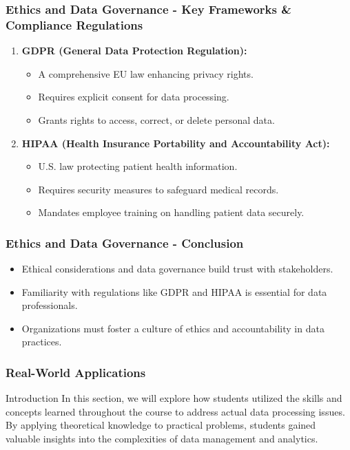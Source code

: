 \documentclass{beamer}
\begin{document}
\begin{frame}[fragile]
    \frametitle{Ethics and Data Governance - Key Frameworks \& Compliance Regulations}
    \begin{enumerate}
        \item \textbf{GDPR (General Data Protection Regulation):}
            \begin{itemize}
                \item A comprehensive EU law enhancing privacy rights.
                \item Requires explicit consent for data processing.
                \item Grants rights to access, correct, or delete personal data.
            \end{itemize}
        
        \item \textbf{HIPAA (Health Insurance Portability and Accountability Act):}
            \begin{itemize}
                \item U.S. law protecting patient health information.
                \item Requires security measures to safeguard medical records.
                \item Mandates employee training on handling patient data securely.
            \end{itemize}
    \end{enumerate}
\end{frame}

\begin{frame}[fragile]
    \frametitle{Ethics and Data Governance - Conclusion}
    \begin{itemize}
        \item Ethical considerations and data governance build trust with stakeholders.
        \item Familiarity with regulations like GDPR and HIPAA is essential for data professionals.
        \item Organizations must foster a culture of ethics and accountability in data practices.
    \end{itemize}
\end{frame}

\begin{frame}
    \frametitle{Real-World Applications}
    \begin{block}{Introduction}
        In this section, we will explore how students utilized the skills and concepts learned throughout the course to address actual data processing issues.
        By applying theoretical knowledge to practical problems, students gained valuable insights into the complexities of data management and analytics.
    \end{block}
\end{frame}
\end{document}
